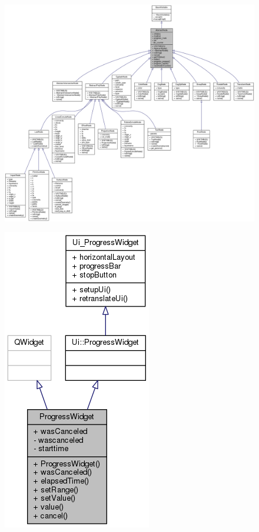 \begin{figure}
\centering
\includegraphics[width=\linewidth,height=1.37\columnwidth]{images/classAbstractNode__inherit__graph}
\caption{}
\label{fig:classabstractnodeinheritgraph}
\end{figure}


\begin{figure}
\centering
\includegraphics[width=0.4\linewidth]{images/classProgressWidget__inherit__graph}
\caption{}
\label{fig:classprogresswidgetinheritgraph}
\end{figure}

